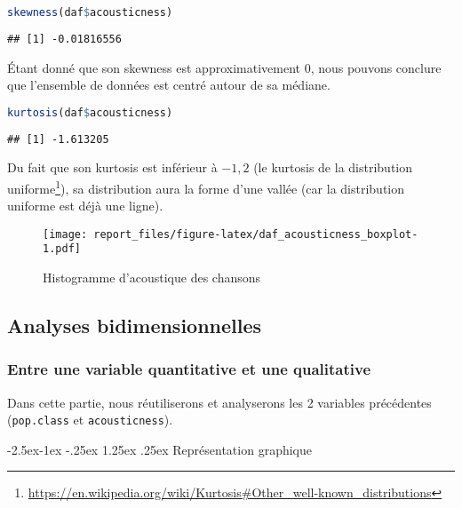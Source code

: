 \documentclass[
  12pt,
  xcolor = usenames,dvipsnames]{article}
\makeatletter
\newcommand{\passthrough}[1]{#1}
\renewcommand\paragraph{\@startsection{paragraph}{4}{\z@}%
        {-2.5ex\@plus -1ex \@minus -.25ex}%
        {1.25ex \@plus .25ex}%
        {\normalfont\normalsize\bfseries}}
\makeatother
\begin{document}
\begin{lstlisting}[language=R]
skewness(daf$acousticness)
\end{lstlisting}

\begin{lstlisting}
## [1] -0.01816556
\end{lstlisting}

Étant donné que son skewness est approximativement 0, nous pouvons
conclure que l'ensemble de données est centré autour de sa médiane.

\begin{lstlisting}[language=R]
kurtosis(daf$acousticness)
\end{lstlisting}

\begin{lstlisting}
## [1] -1.613205
\end{lstlisting}

Du fait que son kurtosis est inférieur à \(-1,2\) (le kurtosis de la
distribution uniforme\footnote{\url{https://en.wikipedia.org/wiki/Kurtosis\#Other_well-known_distributions}}),
sa distribution aura la forme d'une vallée (car la distribution uniforme
est déjà une ligne).

\begin{figure}
\centering
\texttt{[image: report\_files/figure-latex/daf\_acousticness\_boxplot-1.pdf]}
\caption{Histogramme d'acoustique des chansons}
\end{figure}

\hypertarget{analyses-bidimensionnelles}{%
\subsection{Analyses
bidimensionnelles}\label{analyses-bidimensionnelles}}

\hypertarget{entre-une-variable-quantitative-et-une-qualitative}{%
\subsubsection{Entre une variable quantitative et une
qualitative}\label{entre-une-variable-quantitative-et-une-qualitative}}

Dans cette partie, nous réutiliserons et analyserons les 2 variables
précédentes (\passthrough{\lstinline!pop.class!} et
\passthrough{\lstinline!acousticness!}).

\hypertarget{repruxe9sentation-graphique}{%
\paragraph{Représentation graphique}\label{repruxe9sentation-graphique}}
\end{document}
